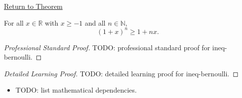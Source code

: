 \newpage
{}
\label{prf:ineq-bernoulli}

\begin{remark*}[Return]
\hyperref[thm:ineq-bernoulli]{Return to Theorem}
\end{remark*}

\begin{theorem*}
For all $x \in \mathbb{R}$ with $x \ge -1$ and all $n \in \mathbb{N}$,
\[
  (1 + x)^n \ge 1 + nx.
\]
\end{theorem*}

\begin{proof}[Professional Standard Proof]
\LRAProofBodyStart
TODO: professional standard proof for ineq-bernoulli.
\end{proof}

\begin{proof}[Detailed Learning Proof]
\LRAProofBodyStart
TODO: detailed learning proof for ineq-bernoulli.
\end{proof}

\begin{remark*}
\end{remark*}

\begin{dependencies}
\begin{itemize}
  \item TODO: list mathematical dependencies.
\end{itemize}
\end{dependencies}

\clearpage
